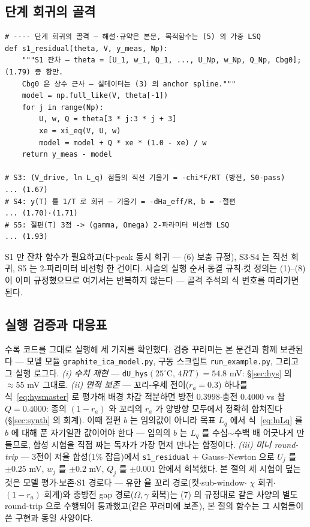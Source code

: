 \documentclass[11pt,a4paper]{article}
\begin{document}
\subsection{단계 회귀의 골격}\label{sec:codestage}
\begin{small}
\begin{verbatim}
# ---- 단계 회귀의 골격 — 해설·규약은 본문, 목적함수는 (5) 의 가중 LSQ
def s1_residual(theta, V, y_meas, Np):
    """S1 잔차 — theta = [U_1, w_1, Q_1, ..., U_Np, w_Np, Q_Np, Cbg0]; (1.79) 종 항만.
    Cbg0 은 상수 근사 — 실데이터는 (3) 의 anchor spline."""
    model = np.full_like(V, theta[-1])
    for j in range(Np):
        U, w, Q = theta[3 * j:3 * j + 3]
        xe = xi_eq(V, U, w)
        model = model + Q * xe * (1.0 - xe) / w
    return y_meas - model

# S3: (V_drive, ln L_q) 점들의 직선 기울기 = -chi*F/RT (방전, S0-pass)      ... (1.67)
# S4: y(T) 를 1/T 로 회귀 — 기울기 = -dHa_eff/R, b = -절편                  ... (1.70)·(1.71)
# S5: 절편(T) 3점 -> (gamma, Omega) 2-파라미터 비선형 LSQ                   ... (1.93)
\end{verbatim}
\end{small}

S1 만 잔차 함수가 필요하고(다-peak 동시 회귀 — (6) 보충 규정), S3$\cdot$S4 는 직선 회귀, S5 는
2-파라미터 비선형 한 건이다. 사슬의 실행 순서$\cdot$동결 규칙$\cdot$컷 정의는 (1)--(8)이 이미
규정했으므로 여기서는 반복하지 않는다 — 골격 주석의 식 번호를 따라가면 된다.

\subsection{실행 검증과 대응표}\label{sec:codeverify}
수록 코드를 그대로 실행해 세 가지를 확인했다. 검증 꾸러미는 본 문건과 함께 보관된다 — 모델 모듈
\texttt{graphite\_ica\_model.py}, 구동 스크립트 \texttt{run\_example.py}, 그리고 그 실행
로그다.
\emph{(i) 수치 재현} — \texttt{dU\_hys}$(25^\circ\mathrm C,\,4RT)=54.8$ mV: \S\ref{sec:hys} 의
$\approx55$ mV 그대로. \emph{(ii) 면적 보존} — 꼬리-우세 전이($r_a=0.3$) 하나를 식~\eqref{eq:hysmaster}
로 평가해 배경 차감 적분하면 방전 $0.3998$$\cdot$충전 $0.4000$ vs 참 $Q=0.4000$: 종의 $(1-r_a)$ 와
꼬리의 $r_a$ 가 양방향 모두에서 정확히 합쳐진다(\S\ref{sec:synth} 의 회계). 이때 절편 $b$ 는 임의값이 아니라 목표 $L_q$ 에서
식~\eqref{eq:lnLq} 를 $b$ 에 대해 푼 자기일관 값이어야 한다 — 임의의 $b$ 는 $L_q$ 를 수십$\sim$수백 배
어긋나게 만들므로, 합성 시험을 직접 짜는 독자가 가장 먼저 만나는 함정이다. \emph{(iii) 미니
round-trip} — 3전이 저율 합성($1\%$ 잡음)에서 \texttt{s1\_residual} $+$ Gauss--Newton 으로
$U_j$ 를 $\pm0.25$ mV, $w_j$ 를 $\pm0.2$ mV, $Q_j$ 를 $\pm0.001$ 안에서 회복했다. 본 절의 세
시험이 덮는 것은 모델 평가$\cdot$보존$\cdot$S1 경로다 — 유한 율 꼬리 경로(컷$\cdot$sub-window$\cdot$
$\chi$ 회귀$\cdot$$(1-r_a)$ 회계)와 충방전 gap 경로($\Omega,\gamma$ 회복)는 (7) 의 규정대로 같은
사양의 별도 round-trip 으로 수행되어 통과했고(같은 꾸러미에 보존), 본 절의 함수는 그 시험들이 쓴
구현과 동일 사양이다.
\end{document}
